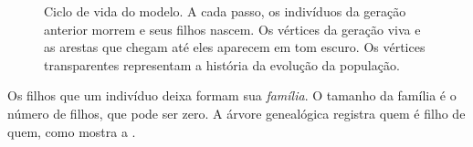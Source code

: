 \documentclass[12pt,portuguese]{article}
\theoremstyle{definition}
\theoremstyle{plainexercise}
\theoremstyle{starredexercise}
\theoremstyle{definition}
\begin{document}
\begin{figure}[H]
  \centering
  \caption{Ciclo de vida do modelo. A cada passo, os indivíduos da geração
    anterior morrem e seus filhos nascem. Os vértices da geração viva e as
    arestas que chegam até eles aparecem em tom escuro. Os vértices
    transparentes representam a história da evolução da população.}
  \label{fig:ciclo-de-vida}
\end{figure}

\begin{samepage}
Os filhos que um indivíduo deixa formam sua \emph{família}. O tamanho da
família é o número de filhos, que pode ser zero. A árvore genealógica
registra quem é filho de quem, como mostra a .
\par
\end{samepage}
\end{document}
